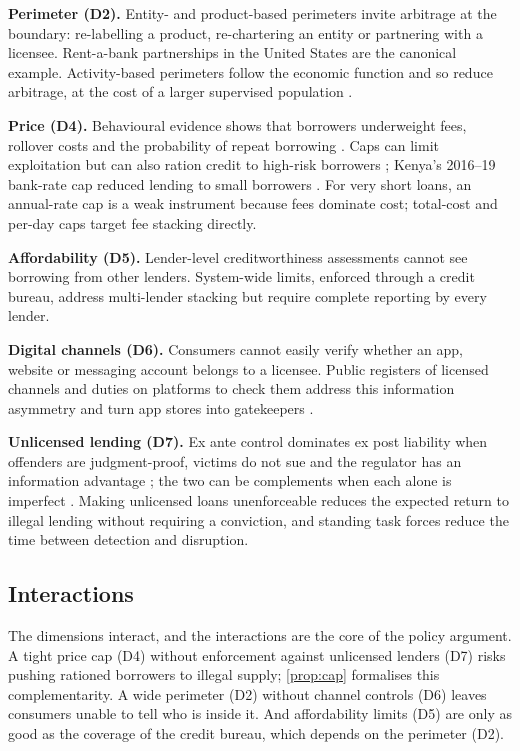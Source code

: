 \documentclass[11pt]{article}
\theoremstyle{plain}
\theoremstyle{definition}
\theoremstyle{remark}
\begin{document}
\textbf{Perimeter (D2).} Entity- and product-based perimeters invite arbitrage at the boundary: re-labelling a product, re-chartering an entity or partnering with a licensee. Rent-a-bank partnerships in the United States are the canonical example. Activity-based perimeters follow the economic function and so reduce arbitrage, at the cost of a larger supervised population \citep{Restoy2021}.

\textbf{Price (D4).} Behavioural evidence shows that borrowers underweight fees, rollover costs and the probability of repeat borrowing \citep{Campbell2011,BarGillWarren2008}. Caps can limit exploitation but can also ration credit to high-risk borrowers \citep{MaimboHenriquez2014,Ferrari2018}; Kenya's 2016--19 bank-rate cap reduced lending to small borrowers \citep{SafavianZia2018}. For very short loans, an annual-rate cap is a weak instrument because fees dominate cost; total-cost and per-day caps target fee stacking directly.

\textbf{Affordability (D5).} Lender-level creditworthiness assessments cannot see borrowing from other lenders. System-wide limits, enforced through a credit bureau, address multi-lender stacking but require complete reporting by every lender.

\textbf{Digital channels (D6).} Consumers cannot easily verify whether an app, website or messaging account belongs to a licensee. Public registers of licensed channels and duties on platforms to check them address this information asymmetry and turn app stores into gatekeepers \citep{Kraakman1986}.

\textbf{Unlicensed lending (D7).} Ex ante control dominates ex post liability when offenders are judgment-proof, victims do not sue and the regulator has an information advantage \citep{Shavell1984}; the two can be complements when each alone is imperfect \citep{Kolstad1990}. Making unlicensed loans unenforceable reduces the expected return to illegal lending without requiring a conviction, and standing task forces reduce the time between detection and disruption.

\subsection{Interactions}

The dimensions interact, and the interactions are the core of the policy argument. A tight price cap (D4) without enforcement against unlicensed lenders (D7) risks pushing rationed borrowers to illegal supply; \cref{prop:cap} formalises this complementarity. A wide perimeter (D2) without channel controls (D6) leaves consumers unable to tell who is inside it. And affordability limits (D5) are only as good as the coverage of the credit bureau, which depends on the perimeter (D2).
\end{document}
